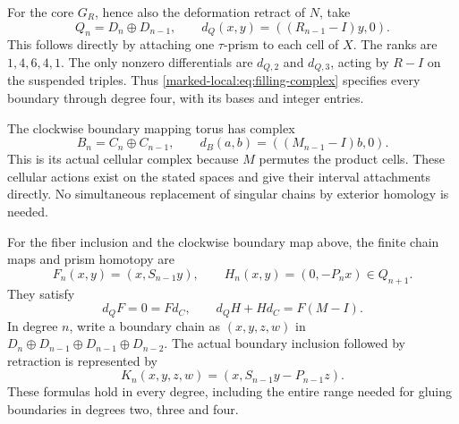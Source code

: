 For the core $G_R$, hence also the deformation retract of $N$, take
\begin{equation}\label{marked-local:eq:filling-complex}
 Q_n=D_n\oplus D_{n-1},\qquad
 d_Q(x,y)=((R_{n-1}-I)y,0).
\end{equation}
This follows directly by attaching one $\tau$-prism to each cell of $X$.
The ranks are $1,4,6,4,1$. The only nonzero differentials are
$d_{Q,2}$ and $d_{Q,3}$, acting by $R-I$ on the suspended triples.
Thus \eqref{marked-local:eq:filling-complex} specifies every boundary through degree
four, with its bases and integer entries.

The clockwise boundary mapping torus has complex
\begin{equation}\label{marked-local:eq:boundary-complex}
 B_n=C_n\oplus C_{n-1},\qquad
 d_B(a,b)=((M_{n-1}-I)b,0).
\end{equation}
This is its actual cellular complex because $M$ permutes the product
cells. These cellular actions exist on the stated spaces and give their
interval attachments directly. No simultaneous replacement of singular
chains by exterior homology is needed.

\begin{theorem}\label{marked-local:thm:maps}
For the fiber inclusion and the clockwise boundary map above, the finite
chain maps and prism homotopy are
\begin{equation}\label{marked-local:eq:F-H}
 F_n(x,y)=(x,S_{n-1}y),\qquad
 H_n(x,y)=(0,-P_nx)\in Q_{n+1}.
\end{equation}
They satisfy
\begin{equation}\label{marked-local:eq:homotopy-identity}
 d_QF=0=Fd_C,\qquad d_QH+Hd_C=F(M-I).
\end{equation}
In degree $n$, write a boundary chain as
$(x,y,z,w)$ in
$D_n\oplus D_{n-1}\oplus D_{n-1}\oplus D_{n-2}$.
The actual boundary inclusion followed by retraction is represented by
\begin{equation}\label{marked-local:eq:K}
 K_n(x,y,z,w)=(x,S_{n-1}y-P_{n-1}z).
\end{equation}
These formulas hold in every degree, including the entire range needed
for gluing boundaries in degrees two, three and four.
\end{theorem}


